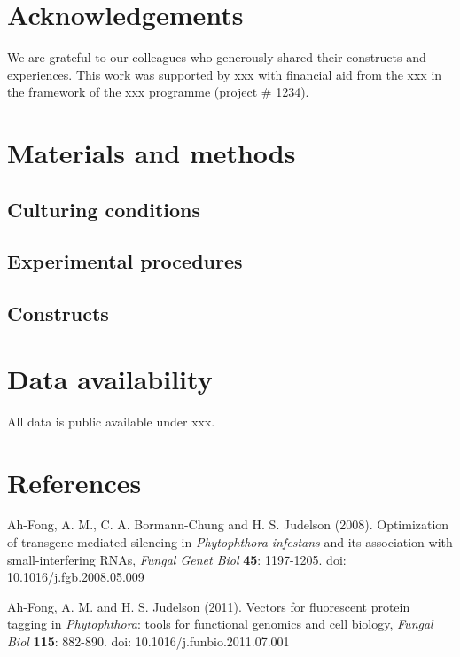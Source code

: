 \documentclass[onecolumn, 11pt,openany]{memoir}
\begin{document}
\begin{multicols}{2}
\section{Acknowledgements}
We are grateful to our colleagues who generously shared their constructs and experiences. This work was supported by xxx with financial aid from the xxx in the framework of the xxx programme (project \# 1234).

\begin{footnotesize}
\section{Materials and methods}

\subsection{Culturing conditions}
\lipsum[1]

\subsection{Experimental procedures}
\lipsum[1]

\subsection{Constructs}
\lipsum[1]

\section{Data availability}
All data is public available under xxx.

\end{footnotesize}

\section{References}
\setlength\parindent{-0.5 em}
\setlength{\parskip}{0 em}
\setlength{\leftskip}{0.5 em}

\begin{sloppy}
\begin{footnotesize}
Ah-Fong, A. M., C. A. Bormann-Chung and H. S. Judelson (2008). Optimization of transgene-mediated silencing in \textit{Phytophthora infestans} and its association with small-interfering RNAs, \textit{Fungal Genet Biol} \textbf{45}: 1197-1205. doi: 10.1016/j.fgb.2008.05.009

Ah-Fong, A. M. and H. S. Judelson (2011). Vectors for fluorescent protein tagging in \textit{Phytophthora}: tools for functional genomics and cell biology, \textit{Fungal Biol} \textbf{115}: 882-890. doi: 10.1016/j.funbio.2011.07.001


\end{footnotesize}
\end{sloppy}
\end{multicols}
\end{document}
